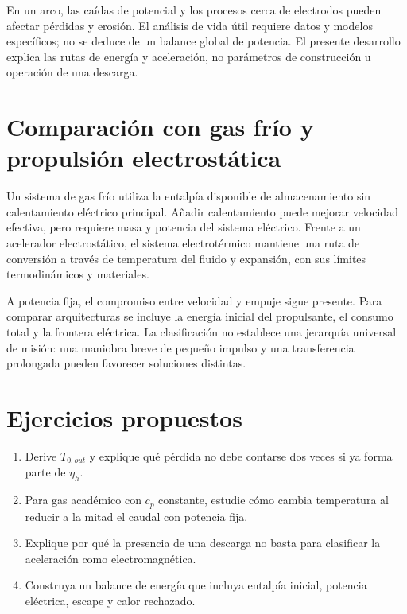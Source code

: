En un arco, las caídas de potencial y los procesos cerca de electrodos pueden afectar pérdidas y erosión. El análisis de vida útil requiere datos y modelos específicos; no se deduce de un balance global de potencia. El presente desarrollo explica las rutas de energía y aceleración, no parámetros de construcción u operación de una descarga.
\section{Comparación con gas frío y propulsión electrostática}
Un sistema de gas frío utiliza la entalpía disponible de almacenamiento sin calentamiento eléctrico principal. Añadir calentamiento puede mejorar velocidad efectiva, pero requiere masa y potencia del sistema eléctrico. Frente a un acelerador electrostático, el sistema electrotérmico mantiene una ruta de conversión a través de temperatura del fluido y expansión, con sus límites termodinámicos y materiales.

A potencia fija, el compromiso entre velocidad y empuje sigue presente. Para comparar arquitecturas se incluye la energía inicial del propulsante, el consumo total y la frontera eléctrica. La clasificación no establece una jerarquía universal de misión: una maniobra breve de pequeño impulso y una transferencia prolongada pueden favorecer soluciones distintas.
\section{Ejercicios propuestos}
\begin{enumerate}
\item Derive $T_{0,out}$ y explique qué pérdida no debe contarse dos veces si ya forma parte de $\eta_h$.
\item Para gas académico con $c_p$ constante, estudie cómo cambia temperatura al reducir a la mitad el caudal con potencia fija.
\item Explique por qué la presencia de una descarga no basta para clasificar la aceleración como electromagnética.
\item Construya un balance de energía que incluya entalpía inicial, potencia eléctrica, escape y calor rechazado.
\end{enumerate}

